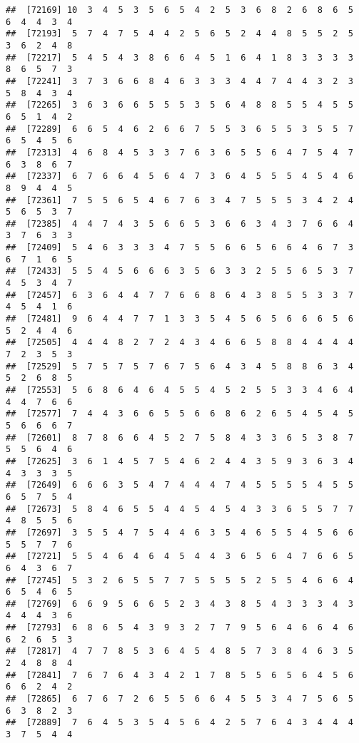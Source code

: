 \documentclass[
]{book}
\begin{document}
\begin{verbatim}
##  [72169] 10  3  4  5  3  5  6  5  4  2  5  3  6  8  2  6  8  6  5  6  4  4  3  4
##  [72193]  5  7  4  7  5  4  4  2  5  6  5  2  4  4  8  5  5  2  5  3  6  2  4  8
##  [72217]  5  4  5  4  3  8  6  6  4  5  1  6  4  1  8  3  3  3  3  8  6  5  7  3
##  [72241]  3  7  3  6  6  8  4  6  3  3  3  4  4  7  4  4  3  2  3  5  8  4  3  4
##  [72265]  3  6  3  6  6  5  5  5  3  5  6  4  8  8  5  5  4  5  5  6  5  1  4  2
##  [72289]  6  6  5  4  6  2  6  6  7  5  5  3  6  5  5  3  5  5  7  6  5  4  5  6
##  [72313]  4  6  8  4  5  3  3  7  6  3  6  5  5  6  4  7  5  4  7  6  3  8  6  7
##  [72337]  6  7  6  6  4  5  6  4  7  3  6  4  5  5  5  4  5  4  6  8  9  4  4  5
##  [72361]  7  5  5  6  5  4  6  7  6  3  4  7  5  5  5  3  4  2  4  5  6  5  3  7
##  [72385]  4  4  7  4  3  5  6  6  5  3  6  6  3  4  3  7  6  6  4  3  7  6  3  3
##  [72409]  5  4  6  3  3  3  4  7  5  5  6  6  5  6  6  4  6  7  3  6  7  1  6  5
##  [72433]  5  5  4  5  6  6  6  3  5  6  3  3  2  5  5  6  5  3  7  4  5  3  4  7
##  [72457]  6  3  6  4  4  7  7  6  6  8  6  4  3  8  5  5  3  3  7  4  5  4  1  6
##  [72481]  9  6  4  4  7  7  1  3  3  5  4  5  6  5  6  6  6  5  6  5  2  4  4  6
##  [72505]  4  4  4  8  2  7  2  4  3  4  6  6  5  8  8  4  4  4  4  7  2  3  5  3
##  [72529]  5  7  5  7  5  7  6  7  5  6  4  3  4  5  8  8  6  3  4  5  2  6  8  5
##  [72553]  5  6  8  6  4  6  4  5  5  4  5  2  5  5  3  3  4  6  4  4  4  7  6  6
##  [72577]  7  4  4  3  6  6  5  5  6  6  8  6  2  6  5  4  5  4  5  5  6  6  6  7
##  [72601]  8  7  8  6  6  4  5  2  7  5  8  4  3  3  6  5  3  8  7  5  5  6  4  6
##  [72625]  3  6  1  4  5  7  5  4  6  2  4  4  3  5  9  3  6  3  4  4  3  3  3  5
##  [72649]  6  6  6  3  5  4  7  4  4  4  7  4  5  5  5  5  4  5  5  6  5  7  5  4
##  [72673]  5  8  4  6  5  5  4  4  5  4  5  4  3  3  6  5  5  7  7  4  8  5  5  6
##  [72697]  3  5  5  4  7  5  4  4  6  3  5  4  6  5  5  4  5  6  6  5  5  7  7  6
##  [72721]  5  5  4  6  4  6  4  5  4  4  3  6  5  6  4  7  6  6  5  6  4  3  6  7
##  [72745]  5  3  2  6  5  5  7  7  5  5  5  5  2  5  5  4  6  6  4  6  5  4  6  5
##  [72769]  6  6  9  5  6  6  5  2  3  4  3  8  5  4  3  3  3  4  3  4  4  4  3  6
##  [72793]  6  8  6  5  4  3  9  3  2  7  7  9  5  6  4  6  6  4  6  6  2  6  5  3
##  [72817]  4  7  7  8  5  3  6  4  5  4  8  5  7  3  8  4  6  3  5  2  4  8  8  4
##  [72841]  7  6  7  6  4  3  4  2  1  7  8  5  5  6  5  6  4  5  6  6  6  2  4  2
##  [72865]  6  7  6  7  2  6  5  5  6  6  4  5  5  3  4  7  5  6  5  6  3  8  2  3
##  [72889]  7  6  4  5  3  5  4  5  6  4  2  5  7  6  4  3  4  4  4  3  7  5  4  4

\end{verbatim}
\end{document}
